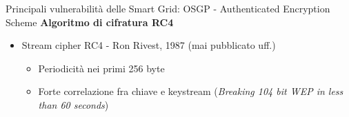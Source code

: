 \begin{frame}{Principali vulnerabilità delle Smart Grid: OSGP - Authenticated Encryption Scheme}
	\textbf{Algoritmo di cifratura RC4}
	\begin{itemize}[<+- | alert@+>]
		\item Stream cipher RC4 - Ron Rivest, 1987 (mai pubblicato uff.)
		\begin{itemize}
			\item Periodicità nei primi 256 byte
			\item Forte correlazione fra chiave e keystream (\textit{Breaking 104 bit WEP in less than 60 seconds})
		\end{itemize}
	\end{itemize}
\end{frame}


%

